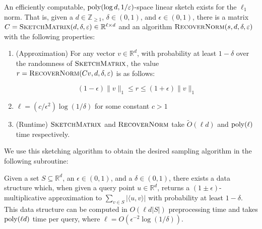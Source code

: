 \begin{theorem}\label{thm:l1-sketch}
An efficiently computable, $\poly(\log d, 1/\epsilon)$-space linear sketch exists for the $\ell_1$ norm. That is, given a $d\in \mathbb{Z}_{\ge 1}$, $\delta\in (0,1)$, and $\epsilon\in (0,1)$, there is a matrix $C = \textsc{SketchMatrix}(d,\delta,\epsilon)\in \mathbb{R}^{\ell\times d}$ and an algorithm $\textsc{RecoverNorm}(s,d,\delta,\epsilon)$ with the following properties:

\begin{enumerate}
    \item (Approximation) For any vector $v\in \mathbb{R}^d$, with probability at least $1 - \delta$ over the randomness of $\textsc{SketchMatrix}$, the value $r = \textsc{RecoverNorm}(Cv, d, \delta, \epsilon)$ is as follows:
    
    $$(1 - \epsilon) \|v\|_1\le r\le (1 + \epsilon)\|v\|_1$$
    \item $\ell = (c/\epsilon^2) \log(1/\delta)$ for some constant $c > 1$
    \item (Runtime) $\textsc{SketchMatrix}$ and $\textsc{RecoverNorm}$ take $\tilde{O}(\ell d)$ and $\poly(\ell)$ time respectively.
\end{enumerate}
\end{theorem}

We use this sketching algorithm to obtain the desired sampling algorithm in the following subroutine:

\begin{corollary}\label{cor:s-data-struct}
Given a set $S\subseteq \mathbb{R}^d$, an $\epsilon\in (0,1)$, and a $\delta\in (0,1)$, there exists a data structure which, when given a query point $u\in \mathbb{R}^d$, returns a $(1 \pm \epsilon)$-multiplicative approximation to $\sum_{v\in S} |\langle u,v\rangle|$ with probability at least $1 - \delta$. This data structure can be computed in $O(\ell d |S|)$ preprocessing time and takes $\poly(\ell d)$ time per query, where $\ell = O( \epsilon^{-2} \log(1/\delta))$.
\end{corollary}

